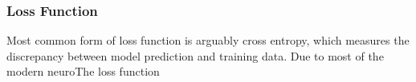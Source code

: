 \subsubsection{Loss Function}

Most common form of loss function is arguably cross entropy, which measures the discrepancy between model prediction and training data. Due to most of the modern neuroThe loss function 